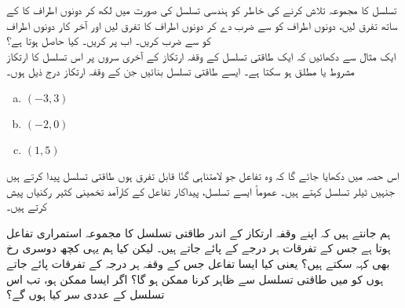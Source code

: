 تسلسل  کا مجموعہ تلاش کرنے کی خاطر  کو ہندسی تسلسل کی صورت میں لکھ کر دونوں اطراف کا  کے ساتھ تفرق لیں، دونوں اطراف کو  سے ضرب دے کر دونوں اطراف کا تفرق لیں اور آخر کار دونوں اطراف کو  سے ضرب کریں۔ اب  پر کریں۔ کیا حاصل ہوتا ہے؟
\\
ایک مثال سے دکھائیں کہ ایک طاقتی تسلسل کے وقفہ ارتکاز کے آخری سروں پر اس تسلسل کا ارتکاز مشروط یا مطلق ہو سکتا ہے۔
ایسے طاقتی تسلسل بنائیں جن کے وقفہ ارتکاز درج ذیل ہوں۔
\begin{multicols}{3}
\begin{enumerate}[a.]
\item
$(-3,3)$
\item
$(-2,0)$
\item
$(1,5)$
\end{enumerate}
\end{multicols}

اس حصہ میں دکھایا جائے گا کہ وہ تفاعل جو لامتناہی گنّا قابل تفرق ہوں طاقتی تسلسل پیدا کرتے ہیں جنہیں ٹیلر تسلسل کہتے ہیں۔  عموماً ایسے تسلسل، پیداکار تفاعل کے کارآمد تخمینی کثیر رکنیاں پیش کرتے ہیں۔

ہم جانتے ہیں کہ اپنے وقفہ ارتکاز کے اندر طاقتی تسلسل کا مجموعہ استمراری تفاعل ہوتا ہے جس کے تفرقات  ہر درجے کے پائے جاتے ہیں۔ لیکن کیا ہم یہی کچھ دوسری رخ بھی کہہ سکتے ہیں؟ یعنی کیا ایسا تفاعل  جس کے وقفہ  ہر درجہ کے تفرقات پائے جاتے ہوں کو  میں طاقتی تسلسل سے ظاہر کرنا ممکن ہو گا؟ اگر ایسا ممکن ہو، تب اس تسلسل کے عددی سر کیا ہوں گے؟


